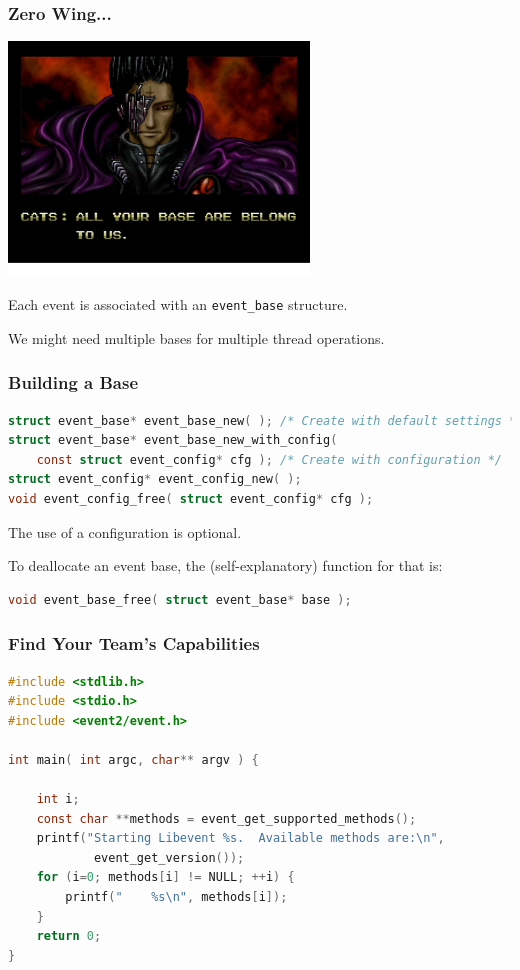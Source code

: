 \begin{frame}
\frametitle{Zero Wing...}

\begin{center}
	\includegraphics[width=0.6\textwidth]{images/allyourbase.png}
\end{center}

Each event is associated with an \texttt{event\_base} structure.

We might need multiple bases for multiple thread operations.

\end{frame}

\begin{frame}[fragile]
\frametitle{Building a Base}

\begin{lstlisting}[language=C]
struct event_base* event_base_new( ); /* Create with default settings */
struct event_base* event_base_new_with_config( 
    const struct event_config* cfg ); /* Create with configuration */
struct event_config* event_config_new( );
void event_config_free( struct event_config* cfg );
\end{lstlisting} 

The use of a configuration is optional.

To deallocate an event base, the (self-explanatory) function for that is:
\begin{lstlisting}[language=C]
void event_base_free( struct event_base* base );
\end{lstlisting}

\end{frame}


\begin{frame}[fragile]
\frametitle{Find Your Team's Capabilities}
\begin{lstlisting}[language=C]
#include <stdlib.h>
#include <stdio.h>
#include <event2/event.h>

int main( int argc, char** argv ) { 

    int i;
    const char **methods = event_get_supported_methods();
    printf("Starting Libevent %s.  Available methods are:\n",
            event_get_version());
    for (i=0; methods[i] != NULL; ++i) {
        printf("    %s\n", methods[i]);
    }   
    return 0;
}
\end{lstlisting}

\end{frame}

